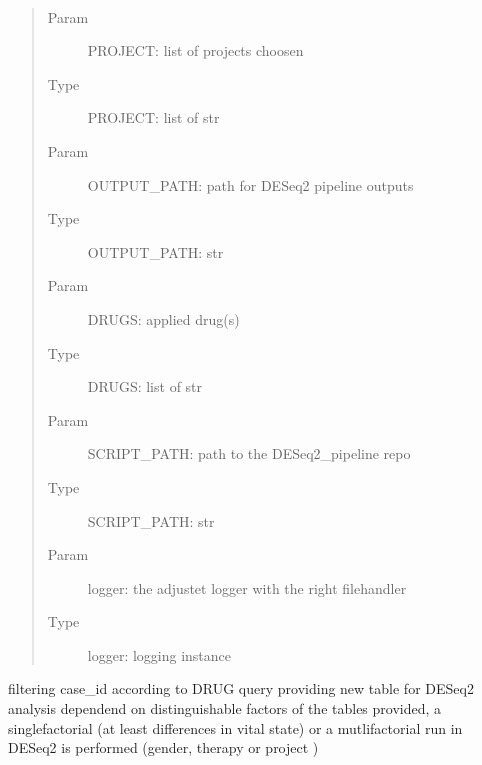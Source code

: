 \documentclass[letterpaper,10pt,english]{sphinxmanual}
\begin{document}

\begin{fulllineitems}
\label{\detokenize{index:create_matrix_new.provide_DESeq2_table}}~\begin{quote}\begin{description}
\item[{Param}] \leavevmode
\sphinxAtStartPar
PROJECT: list of projects choosen

\item[{Type}] \leavevmode
\sphinxAtStartPar
PROJECT: list of str

\item[{Param}] \leavevmode
\sphinxAtStartPar
OUTPUT\_PATH: path for DESeq2 pipeline outputs

\item[{Type}] \leavevmode
\sphinxAtStartPar
OUTPUT\_PATH: str

\item[{Param}] \leavevmode
\sphinxAtStartPar
DRUGS: applied drug(s)

\item[{Type}] \leavevmode
\sphinxAtStartPar
DRUGS: list of str

\item[{Param}] \leavevmode
\sphinxAtStartPar
SCRIPT\_PATH: path to the DESeq2\_pipeline repo

\item[{Type}] \leavevmode
\sphinxAtStartPar
SCRIPT\_PATH: str

\item[{Param}] \leavevmode
\sphinxAtStartPar
logger: the adjustet logger with the right filehandler

\item[{Type}] \leavevmode
\sphinxAtStartPar
logger: logging instance

\end{description}\end{quote}

\sphinxAtStartPar
filtering case\_id according to DRUG query
providing new table for DESeq2 analysis
dependend on distinguishable factors of the tables provided, a
singlefactorial (at least differences in vital state) or a mutlifactorial
run in DESeq2 is performed (gender, therapy or project )


\end{fulllineitems}
\end{document}
